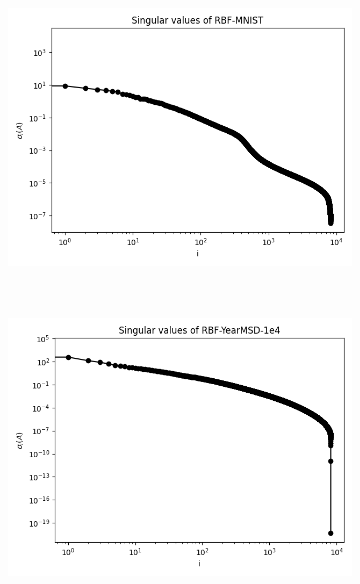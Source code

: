 \documentclass{article}
\theoremstyle{definition}
\begin{document}
\begin{figure}
\centering
\begin{subfigure}[t]{\textwidth+20pt\relax}
    \includegraphics[width=\dimexpr\linewidth-20pt\relax]{plots/singular_values/singular_values_RBF-MNIST.png}
\end{subfigure}\
\begin{subfigure}[t]{\textwidth+20pt\relax}
    \includegraphics[width=\dimexpr\linewidth-20pt\relax]{plots/singular_values/singular_values_RBF-YearMSD-1e4.png}
\end{subfigure}

\end{figure}
\end{document}
